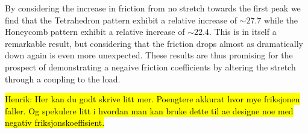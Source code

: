 By considering the increase in friction from no stretch towards the first peak we find that the Tetrahedron pattern exhibit a relative increase of $\sim 27.7$ while the Honeycomb pattern exhibit a relative increase of $\sim 22.4$. This is in itself a remarkable result, but considering that the friction drops almost as dramatically down again is even more unexpected. These results are thus promising for the prospect of demonstrating a negaive friction coefficients by altering the stretch through a coupling to the load.


\hl{Henrik: Her kan du godt skrive litt mer. Poengtere akkurat hvor mye friksjonen faller. Og spekulere litt i hvordan man kan bruke dette til ae designe noe med negativ friksjonskoeffisient.}






